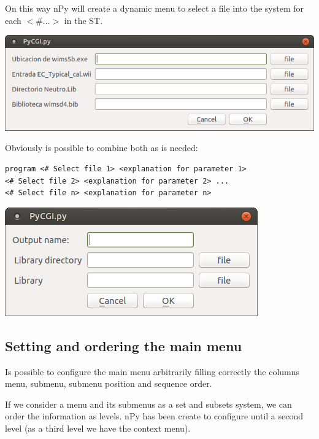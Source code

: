 \documentclass[a4paper,10pt]{article}
\begin{document}
On this way nPy will create a dynamic menu to select a file into the system for each $<\# ...>$ in the 
ST.

\begin{center}
 \includegraphics[width=\textwidth]{img/contextMenuFile.png}
\end{center}

\noindent Obviously is possible to combine both as is needed:

\begin{verbatim}
program <# Select file 1> <explanation for parameter 1> 
<# Select file 2> <explanation for parameter 2> ... 
<# Select file n> <explanation for parameter n>
 \end{verbatim}

 \begin{center}
 \includegraphics[width=\textwidth]{img/contextMenuCombined.png}
\end{center}

\subsection{Setting and ordering the main menu}

Is possible to configure the main menu arbitrarily filling correctly the columns menu, submenu, submenu position and sequence order.

If we consider a menu and its submenus as a set and subsets system, we can order the information as levels. nPy has been create to configure until a second level (as a third level we have the context menu).
\end{document}
